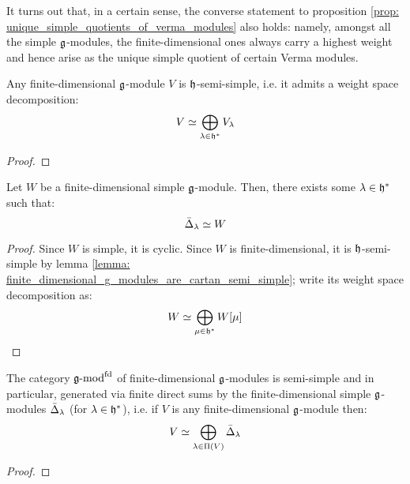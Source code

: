         It turns out that, in a certain sense, the converse statement to proposition \ref{prop: unique_simple_quotients_of_verma_modules} also holds: namely, amongst all the simple $\mathfrak{g}$-modules, the finite-dimensional ones always carry a highest weight and hence arise as the unique simple quotient of certain Verma modules.
        \begin{lemma} \label{lemma: finite_dimensional_g_modules_are_cartan_semi_simple}
            Any finite-dimensional $\mathfrak{g}$-module $V$ is $\mathfrak{h}$-semi-simple, i.e. it admits a weight space decomposition:
                $$V \simeq \bigoplus_{\lambda \in \mathfrak{h}^*} V_{\lambda}$$
        \end{lemma}
            \begin{proof}
                
            \end{proof}
        \begin{proposition} \label{prop: finite_dimensional_simple_g_modules_are_simple_quotients_of_verma_modules}
            Let $W$ be a finite-dimensional simple $\mathfrak{g}$-module. Then, there exists some $\lambda \in \mathfrak{h}^*$ such that:
                $$\bar{\Delta}_{\lambda} \simeq W$$
        \end{proposition}
            \begin{proof}
                Since $W$ is simple, it is cyclic. Since $W$ is finite-dimensional, it is $\mathfrak{h}$-semi-simple by lemma \ref{lemma: finite_dimensional_g_modules_are_cartan_semi_simple}; write its weight space decomposition as:
                    $$W \simeq \bigoplus_{\mu \in \mathfrak{h}^*} W[\mu]$$
            \end{proof}
        \begin{corollary} \label{corollary: weyl_semi_simplicity_theorem}
            The category $\mathfrak{g}\text{-}\mathrm{mod}^{\mathrm{fd}}$ of finite-dimensional $\mathfrak{g}$-modules is semi-simple and in particular, generated via finite direct sums by the finite-dimensional simple $\mathfrak{g}$-modules $\bar{\Delta}_{\lambda}$ (for $\lambda \in \mathfrak{h}^*$), i.e. if $V$ is any finite-dimensional $\mathfrak{g}$-module then:
                $$V \simeq \bigoplus_{\lambda \in \Pi(V)} \bar{\Delta}_{\lambda}$$
        \end{corollary}
            \begin{proof}
                
            \end{proof}

